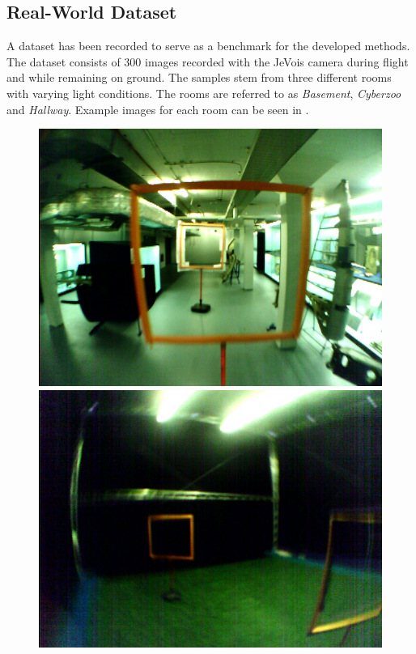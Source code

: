 \subsection{Real-World Dataset}

A dataset has been recorded to serve as a benchmark for the developed methods. The dataset consists of 300 images recorded with the JeVois camera during flight and while remaining on ground. The samples stem from three different rooms with varying light conditions. The rooms are referred to as \textit{Basement}, \textit{Cyberzoo} and \textit{Hallway}. Example images for each room can be seen in .
\begin{figure}
	\centering
	\begin{minipage}{0.3\textwidth}
		\includegraphics[width=\textwidth]{fig/basement}
	\end{minipage}\hfill
	\begin{minipage}{0.3\textwidth}
		\includegraphics[width=\textwidth]{fig/cyberzoo}

\end{minipage}
\end{figure}
